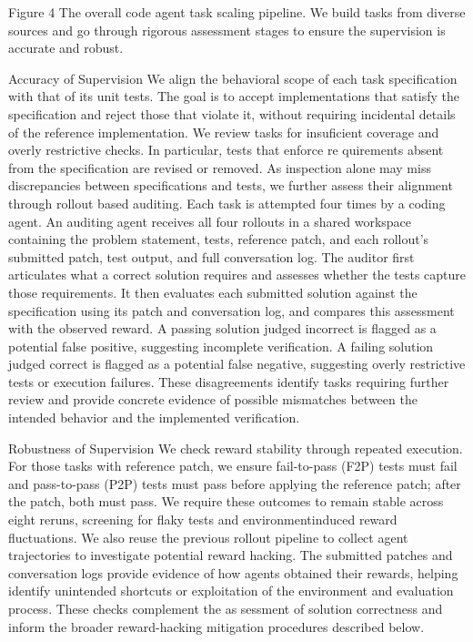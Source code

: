 \documentclass[
  10
]{article}
\begin{document}
Figure 4 The overall code agent task scaling pipeline. We build tasks
from diverse sources and go through rigorous assessment stages to ensure
the supervision is accurate and robust.

Accuracy of Supervision We align the behavioral scope of each task
specification with that of its unit tests. The goal is to accept
implementations that satisfy the specification and reject those that
violate it, without requiring incidental details of the reference
implementation. We review tasks for insuficient coverage and overly
restrictive checks. In particular, tests that enforce re quirements
absent from the specification are revised or removed. As inspection
alone may miss discrepancies between specifications and tests, we
further assess their alignment through rollout based auditing. Each task
is attempted four times by a coding agent. An auditing agent receives
all four rollouts in a shared workspace containing the problem
statement, tests, reference patch, and each rollout's submitted patch,
test output, and full conversation log. The auditor first articulates
what a correct solution requires and assesses whether the tests capture
those requirements. It then evaluates each submitted solution against
the specification using its patch and conversation log, and compares
this assessment with the observed reward. A passing solution judged
incorrect is flagged as a potential false positive, suggesting
incomplete verification. A failing solution judged correct is flagged as
a potential false negative, suggesting overly restrictive tests or
execution failures. These disagreements identify tasks requiring further
review and provide concrete evidence of possible mismatches between the
intended behavior and the implemented verification.

Robustness of Supervision We check reward stability through repeated
execution. For those tasks with reference patch, we ensure fail-to-pass
(F2P) tests must fail and pass-to-pass (P2P) tests must pass before
applying the reference patch; after the patch, both must pass. We
require these outcomes to remain stable across eight reruns, screening
for flaky tests and environmentinduced reward fluctuations. We also
reuse the previous rollout pipeline to collect agent trajectories to
investigate potential reward hacking. The submitted patches and
conversation logs provide evidence of how agents obtained their rewards,
helping identify unintended shortcuts or exploitation of the environment
and evaluation process. These checks complement the as sessment of
solution correctness and inform the broader reward-hacking mitigation
procedures described below.
\end{document}
